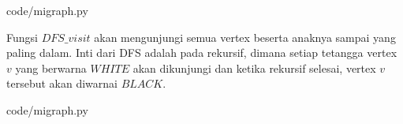 
                {code/migraph.py}

Fungsi $DFS\_visit$ akan mengunjungi semua vertex beserta anaknya sampai yang paling dalam. Inti dari DFS adalah pada rekursif, dimana setiap tetangga vertex $v$ yang berwarna $WHITE$ akan dikunjungi dan ketika rekursif selesai, vertex $v$ tersebut akan diwarnai $BLACK$.


                {code/migraph.py}

